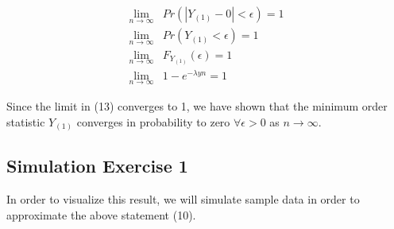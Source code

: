 \documentclass[
]{article}
\begin{document}
\begin{align}
\lim_{n \to \infty} & Pr\left(\left| Y_{(1)} - 0 \right| < \epsilon\right) = 1 \\
\lim_{n \to \infty} & Pr\left(Y_{(1)} < \epsilon \right) = 1 \\
\lim_{n \to \infty} & F_{Y_{(1)}}(\epsilon) = 1 \\
\lim_{n \to \infty} & 1 - e^{- \lambda yn} = 1 
\end{align}

Since the limit in (13) converges to 1, we have shown that the minimum order statistic $Y_{(1)}$ converges in probability to zero $\forall\epsilon > 0$ as $n \to \infty$.

\hypertarget{simulation-exercise-1}{%
\subsection{Simulation Exercise 1}\label{simulation-exercise-1}}

In order to visualize this result, we will simulate sample data in order
to approximate the above statement (10).
\end{document}
